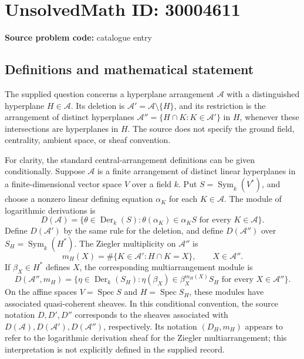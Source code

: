 \documentclass[11pt]{article}
\begin{document}
\section*{UnsolvedMath ID: 30004611}
\textbf{Source problem code:} catalogue entry
\subsection{Definitions and mathematical statement}
The supplied question concerns a hyperplane arrangement \(\mathcal A\) with a distinguished hyperplane \(H\in\mathcal A\). Its deletion is \(\mathcal A'=\mathcal A\setminus\{H\}\), and its restriction is the arrangement of distinct hyperplanes \(\mathcal A''=\{H\cap K:K\in\mathcal A'\}\) in \(H\), whenever these intersections are hyperplanes in \(H\). The source does not specify the ground field, centrality, ambient space, or sheaf convention.

For clarity, the standard central-arrangement definitions can be given conditionally. Suppose \(\mathcal A\) is a finite arrangement of distinct linear hyperplanes in a finite-dimensional vector space \(V\) over a field \(k\). Put \(S=\operatorname{Sym}_k(V^*)\), and choose a nonzero linear defining equation \(\alpha_K\) for each \(K\in\mathcal A\). The module of logarithmic derivations is
\[
D(\mathcal A)=\{\theta\in\operatorname{Der}_k(S):\theta(\alpha_K)\in\alpha_KS\text{ for every }K\in\mathcal A\}.
\]
Define \(D(\mathcal A')\) by the same rule for the deletion, and define \(D(\mathcal A'')\) over \(S_H=\operatorname{Sym}_k(H^*)\). The Ziegler multiplicity on \(\mathcal A''\) is
\[
m_H(X)=\#\{K\in\mathcal A':H\cap K=X\},\qquad X\in\mathcal A''.
\]
If \(\beta_X\in H^*\) defines \(X\), the corresponding multiarrangement module is
\[
D(\mathcal A'',m_H)=\{\eta\in\operatorname{Der}_k(S_H):\eta(\beta_X)\in\beta_X^{m_H(X)}S_H\text{ for every }X\in\mathcal A''\}.
\]
On the affine spaces \(V=\operatorname{Spec}S\) and \(H=\operatorname{Spec}S_H\), these modules have associated quasi-coherent sheaves. In this conditional convention, the source notation \(D,D',D''\) corresponds to the sheaves associated with \(D(\mathcal A),D(\mathcal A'),D(\mathcal A'')\), respectively. Its notation \((D_H,m_H)\) appears to refer to the logarithmic derivation sheaf for the Ziegler multiarrangement; this interpretation is not explicitly defined in the supplied record.
\end{document}
